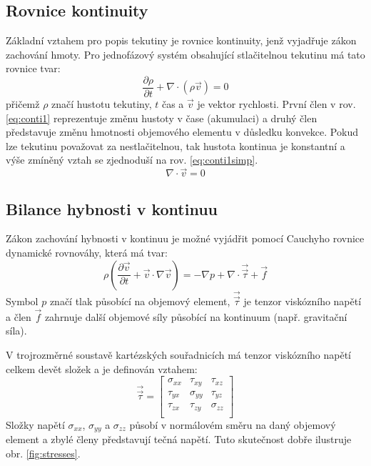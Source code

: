 \subsection{Rovnice kontinuity}

Základní vztahem pro popis tekutiny je rovnice kontinuity, jenž vyjadřuje zákon zachování hmoty. Pro jednofázový systém obsahující stlačitelnou tekutinu má tato rovnice tvar:
\begin{equation}
	\frac{\partial \rho}{\partial t} + \nabla \cdot (\rho\vec{v}) = 0
	\label{eq:conti1}
\end{equation}
přičemž $\rho$ značí hustotu tekutiny, $t$ čas a $\vec{v}$ je vektor rychlosti. První člen v rov. \ref{eq:conti1} reprezentuje změnu hustoty v čase (akumulaci) a druhý člen představuje změnu hmotnosti objemového elementu v důsledku konvekce. Pokud lze tekutinu považovat za nestlačitelnou, tak hustota kontinua je konstantní a výše zmíněný vztah se zjednoduší na rov. \ref{eq:conti1simp}.
\begin{equation}
	\nabla \cdot \vec{v} = 0
	\label{eq:conti1simp}
\end{equation}  

\subsection{Bilance hybnosti v kontinuu}
Zákon zachování hybnosti v kontinuu je možné vyjádřit pomocí Cauchyho rovnice dynamické rovnováhy, která má tvar:
\begin{equation}
    \rho \left( \frac{\partial \vec{v}}{\partial t} + \vec{v} \cdot \nabla  \vec{v} \right) = -\nabla p +  \nabla \cdot \vec{\vec{\tau}} + \vec{f}
  	\label{eq:cauchy}
\end{equation} 
Symbol $p$ značí tlak působící na objemový element, $\vec{\vec{\tau}}$ je tenzor viskózního napětí a člen $\vec{f}$ zahrnuje další objemové síly působící na kontinuum (např. gravitační síla).

V trojrozměrné soustavě kartézských souřadnicích má tenzor viskózního napětí celkem devět složek a je definován vztahem:
\begin{equation}
    \vec{\vec{\tau}} = 
    \begin{bmatrix}
      \sigma_{xx} & \tau_{xy} & \tau_{xz}\\ 
      \tau_{yx} & \sigma_{yy} & \tau_{yz}\\ 
      \tau_{zx} & \tau_{zy} & \sigma_{zz}\\ 
    \end{bmatrix}
  	\label{eq:tenstress}
\end{equation} 
Složky napětí $\sigma_{xx}$, $\sigma_{yy}$ a $\sigma_{zz}$ působí v normálovém směru na daný objemový element a zbylé členy představují tečná napětí. Tuto skutečnost dobře ilustruje obr. \ref{fig:stresses}. 

